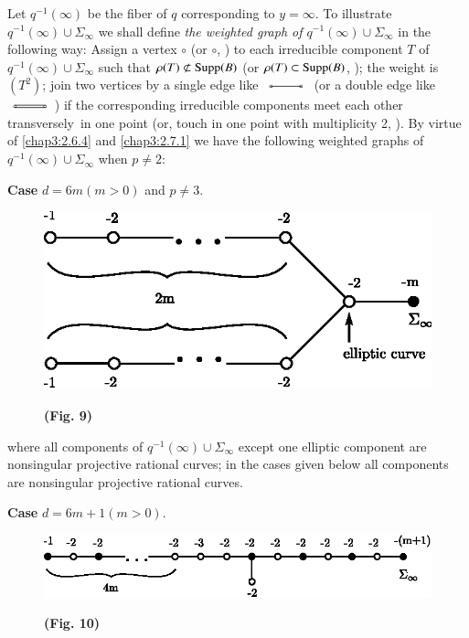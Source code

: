 \subsubsection{}\label{chap3:2.7.3}
Let $q^{-1}(\infty)$ be the fiber of $q$ corresponding to
$y=\infty$. To illustrate $q^{-1}(\infty)\cup \Sigma_{\infty}$ we
shall define {\em the weighted graph of $q^{-1}(\infty)\cup
  \Sigma_{\infty}$} in the following way: Assign a vertex $\circ$ (or $\circ$,
\resp) to each irreducible component $T$ of
$q^{-1}(\infty)\cup\Sigma_{\infty}$ such that $\rho(T)\not\subset
\operatorname{Supp}(B)$ (or $\rho(T)\subset \operatorname{Supp}(B)$, \resp); the weight is
$(T^{2})$; join two vertices by a single edge like $\xymatrix{
  \ar@{o-o}[r] & }$ (or a double edge like $\xymatrix{
  \ar@{o=o}[r] & }$) if the corresponding irreducible components meet
each other transversely\pageoriginale\ in one point (or, touch in one
point with multiplicity 2, \resp). By virtue of \ref{chap3:2.6.4} and
\ref{chap3:2.7.1} we have the following weighted graphs of
$q^{-1}(\infty)\cup \Sigma_{\infty}$ when $p\neq 2$:

\medskip
\noindent
{\bf Case} $d=6m(m>0)$ and $p\neq 3$.
\begin{figure}[H]
\centering
\includegraphics{figures/miyansi_fig10.eps}

\bigskip
\centerline{\bf(Fig. 9)}
\end{figure}
\noindent
where all components of $q^{-1}(\infty)\cup \Sigma_{\infty}$ except
one elliptic component are nonsingular projective rational curves; in
the cases given below all components are nonsingular projective
rational curves.

\medskip
\noindent
{\bf Case} $d=6m+1(m>0)$.
\begin{figure}[H]
\centering
\includegraphics{figures/miyansi_fig11.eps}

\bigskip
\centerline{\bf(Fig. 10)}
\end{figure}



